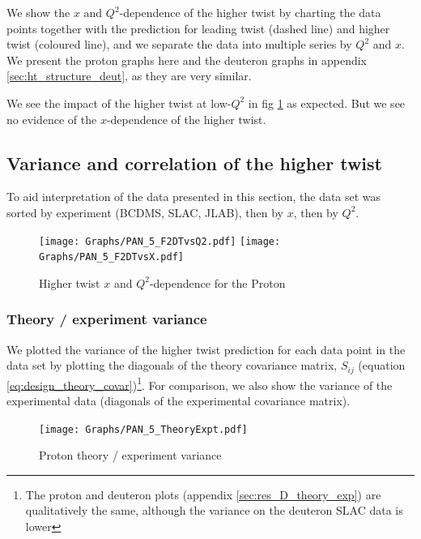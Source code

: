 \documentclass[12pt,a4paper]{report}
\begin{document}
We show the $x$ and $Q^2$-dependence of the higher twist by charting the data points together with the prediction for leading twist (dashed line) and higher twist (coloured line), and we separate the data into multiple series by $Q^2$ and $x$. We present the proton graphs here and the deuteron graphs in appendix \ref{sec:ht_structure_deut}, as they are very similar.

We see the impact of the higher twist at low-$Q^2$ in fig \ref{fig:res_ht_XQ2_Dep} as expected. But we see no evidence of the $x$-dependence of the higher twist.

\subsection{Variance and correlation of the higher twist} \label{sec:ht_correl_covar}

To aid interpretation of the data presented in this section, the data set was sorted by experiment (BCDMS, SLAC, JLAB), then by $x$, then by $Q^2$.

\begin{figure}[H]
\begin{center}
\texttt{[image: Graphs/PAN\_5\_F2DTvsQ2.pdf]}
\texttt{[image: Graphs/PAN\_5\_F2DTvsX.pdf]}
\caption{Higher twist $x$ and $Q^2$-dependence for the Proton}
\label{fig:res_ht_XQ2_Dep}
\end{center}
\end{figure}

\subsubsection{Theory / experiment variance}

We plotted the variance of the higher twist prediction for each data point in the data set by plotting the diagonals of the theory covariance matrix, $S_{ij}$ (equation \ref{eq:design_theory_covar})\footnote{The proton and deuteron plots (appendix \ref{sec:res_D_theory_exp}) are qualitatively the same, although the variance on the deuteron SLAC data is lower}. For comparison, we also show the variance of the experimental data (diagonals of the experimental covariance matrix).

\begin{figure}[ht]
\begin{center}
\texttt{[image: Graphs/PAN\_5\_TheoryExpt.pdf]}
\caption{Proton theory / experiment variance}
\label{fig:res_P_theory_covar}
\end{center}
\end{figure}
\end{document}
